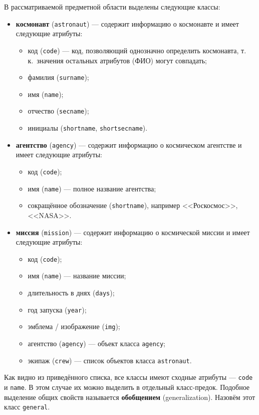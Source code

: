 \documentclass[a4paper,14pt]{extarticle}
\begin{document}
В рассматриваемой предметной области выделены следующие классы:
\begin{itemize}[leftmargin=*,itemsep=2pt,topsep=4pt]
\item \textbf{космонавт} (\texttt{astronaut}) --- содержит информацию о космонавте и имеет следующие атрибуты:
  \begin{itemize}[leftmargin=*,itemsep=1pt]
  \item код (\texttt{code}) --- код, позволяющий однозначно определить космонавта, т.\,к.\ значения остальных атрибутов (ФИО) могут совпадать;
  \item фамилия (\texttt{surname});
  \item имя (\texttt{name});
  \item отчество (\texttt{secname});
  \item инициалы (\texttt{shortname}, \texttt{shortsecname}).
  \end{itemize}
\item \textbf{агентство} (\texttt{agency}) --- содержит информацию о космическом агентстве и имеет следующие атрибуты:
  \begin{itemize}[leftmargin=*,itemsep=1pt]
  \item код (\texttt{code});
  \item имя (\texttt{name}) --- полное название агентства;
  \item сокращённое обозначение (\texttt{shortname}), например <<Роскосмос>>, <<NASA>>.
  \end{itemize}
\item \textbf{миссия} (\texttt{mission}) --- содержит информацию о космической миссии и имеет следующие атрибуты:
  \begin{itemize}[leftmargin=*,itemsep=1pt]
  \item код (\texttt{code});
  \item имя (\texttt{name}) --- название миссии;
  \item длительность в днях (\texttt{days});
  \item год запуска (\texttt{year});
  \item эмблема / изображение (\texttt{img});
  \item агентство (\texttt{agency}) --- объект класса \texttt{agency};
  \item экипаж (\texttt{crew}) --- список объектов класса \texttt{astronaut}.
  \end{itemize}
\end{itemize}

Как видно из приведённого списка, все классы имеют сходные атрибуты --- \texttt{code} и \texttt{name}. В этом случае их можно выделить в отдельный класс-предок. Подобное выделение общих свойств называется \textbf{обобщением} (generalization). Назовём этот класс \texttt{general}.
\end{document}
